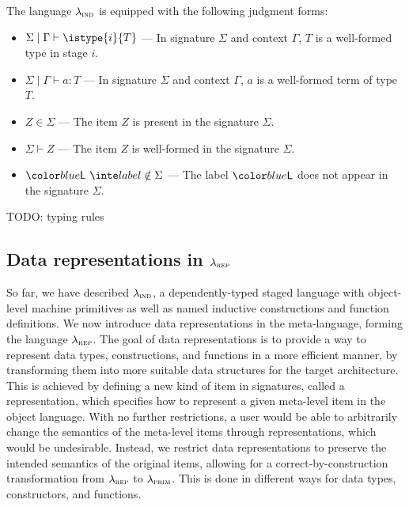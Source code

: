 The language $\lambda_{\textsc{ind}}$ is equipped with the following judgment forms:
\begin{itemize}
  \item $\Sigma \mid \Gamma \vdash \istype{i}{T}$ --- In signature $\Sigma$ and
        context $\Gamma$, $T$ is a well-formed type in stage $i$.
  \item $\Sigma \mid \Gamma \vdash a : T$ --- In signature $\Sigma$ and context
        $\Gamma$, $a$ is a well-formed term of type $T$.
  \item $Z \in \Sigma$ --- The item $Z$ is present in the signature $\Sigma$.
  \item $\Sigma \vdash Z$ --- The item $Z$ is well-formed in the signature $\Sigma$.
  \item $\isLabNotIn{L}{\Sigma}$ --- The label $\lab{L}$ does not appear in the
        signature $\Sigma$.
\end{itemize}

TODO: typing rules

\subsection{Data representations in $\lambda_{\textsc{rep}}$}

So far, we have described $\lambda_{\textsc{ind}}$, a dependently-typed staged language
with object-level machine primitives as well as named inductive constructions
and function definitions. We now introduce data representations in the
meta-language, forming the language $\lambda_{\textsc{rep}}$. The goal of data
representations is to provide a way to represent data types, constructions, and
functions in a more efficient manner, by transforming them into more suitable
data structures for the target architecture. This is achieved by defining a new
kind of item in signatures, called a representation, which specifies how to
represent a given meta-level item in the object language. With no further
restrictions, a user would be able to arbitrarily change the semantics of the
meta-level items through representations, which would be undesirable. Instead,
we restrict data representations to preserve the intended semantics of the
original items, allowing for a correct-by-construction transformation from
$\lambda_{\textsc{rep}}$ to $\lambda_{\textsc{prim}}$. This is done in different ways for data types,
constructors, and functions.


